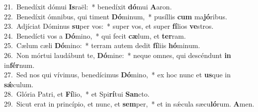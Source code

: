 {21.~}Benedíxit dómui \textbf{Is}raël:~* benedíxit \textbf{dó}mui \textbf{A}aron.\\
{22.~}Benedíxit ómnibus, qui timent \textbf{Dó}minum,~* pusíllis \textbf{cum} ma\textbf{jó}ribus.\\
{23.~}Adjíciat Dóminus \textbf{su}per vos:~* super vos, et super \textbf{fí}lios \textbf{ve}stros.\\
{24.~}Benedícti vos a \textbf{Dó}mino,~* qui fecit \textbf{cæ}lum, et \textbf{ter}ram.\\
{25.~}Cælum cæli \textbf{Dó}mino:~* terram autem dedit \textbf{fí}liis \textbf{hó}minum.\\
{26.~}Non mórtui laudábunt te, \textbf{Dó}mine:~* neque omnes, qui descéndunt \textbf{in} in\textbf{fér}num.\\
{27.~}Sed nos qui vívimus, benedícimus \textbf{Dó}mino,~* ex hoc nunc et \textbf{us}que in \textbf{sǽ}culum.\\
{28.~}Glória Patri, et \textbf{Fí}lio,~* et Spi\textbf{rí}tui \textbf{San}cto.\\
{29.~}Sicut erat in princípio, et nunc, et \textbf{sem}per,~* et in sǽcula sæcu\textbf{ló}rum. \textbf{A}men.\\
